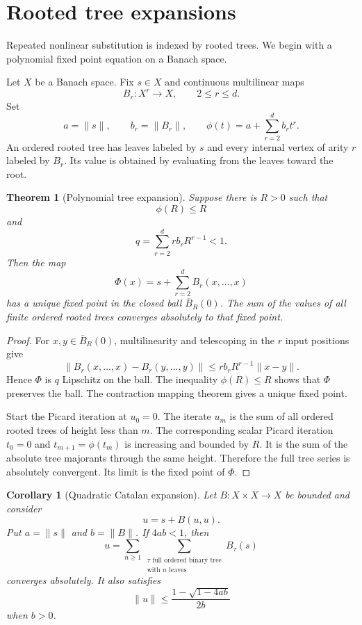 \documentclass{aomart}
\newtheorem{theorem}{Theorem}[section]
\newtheorem{corollary}[corollary]{Corollary}
\theoremstyle{definition}
\theoremstyle{remark}
\begin{document}
\section{Rooted tree expansions}\label{sec:trees}

Repeated nonlinear substitution is indexed by rooted trees.  We begin with a polynomial fixed point equation on a Banach space.

Let $X$ be a Banach space.  Fix $s\in X$ and continuous multilinear maps
\[
B_r:X^r\longrightarrow X,
\qquad
2\le r\le d.
\]
Set
\[
a=\|s\|,
\qquad
b_r=\|B_r\|,
\qquad
\phi(t)=a+\sum_{r=2}^{d}b_rt^r.
\]
An ordered rooted tree has leaves labeled by $s$ and every internal vertex of arity $r$ labeled by $B_r$.  Its value is obtained by evaluating from the leaves toward the root.

\begin{theorem}[Polynomial tree expansion]\label{thm:polynomial_tree_expansion}
Suppose there is $R>0$ such that
\[
\phi(R)\le R
\]
and
\[
q=
\sum_{r=2}^{d}r b_rR^{r-1}<1.
\]
Then the map
\[
\Phi(x)=s+\sum_{r=2}^{d}B_r(x,\ldots,x)
\]
has a unique fixed point in the closed ball $\overline B_R(0)$.  The sum of the values of all finite ordered rooted trees converges absolutely to that fixed point.
\end{theorem}

\begin{proof}
For $x,y\in\overline B_R(0)$, multilinearity and telescoping in the $r$ input positions give
\[
\|B_r(x,\ldots,x)-B_r(y,\ldots,y)\|
\le
r b_rR^{r-1}\|x-y\|.
\]
Hence $\Phi$ is $q$ Lipschitz on the ball.  The inequality $\phi(R)\le R$ shows that $\Phi$ preserves the ball.  The contraction mapping theorem gives a unique fixed point.

Start the Picard iteration at $u_0=0$.  The iterate $u_m$ is the sum of all ordered rooted trees of height less than $m$.  The corresponding scalar Picard iteration $t_0=0$ and $t_{m+1}=\phi(t_m)$ is increasing and bounded by $R$.  It is the sum of the absolute tree majorants through the same height.  Therefore the full tree series is absolutely convergent.  Its limit is the fixed point of $\Phi$.
\end{proof}

\begin{corollary}[Quadratic Catalan expansion]\label{cor:quadratic_tree_expansion}
Let $B:X\times X\to X$ be bounded and consider
\[
u=s+B(u,u).
\]
Put $a=\|s\|$ and $b=\|B\|$.  If $4ab<1$, then
\[
u=
\sum_{n\ge1}
\sum_{\substack{\tau\text{ full ordered binary tree}\\\text{with }n\text{ leaves}}}
B_\tau(s)
\]
converges absolutely.  It also satisfies
\[
\|u\|
\le
\frac{1-\sqrt{1-4ab}}{2b}
\]
when $b>0$.
\end{corollary}
\end{document}
